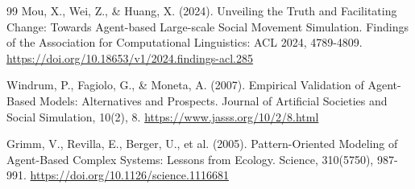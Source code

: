 \documentclass[11pt,a4paper]{article}
\begin{document}
\begin{thebibliography}{99}
Mou, X., Wei, Z., \& Huang, X. (2024). Unveiling the Truth and Facilitating Change: Towards Agent-based Large-scale Social Movement Simulation. Findings of the Association for Computational Linguistics: ACL 2024, 4789-4809. \url{https://doi.org/10.18653/v1/2024.findings-acl.285}

Windrum, P., Fagiolo, G., \& Moneta, A. (2007). Empirical Validation of Agent-Based Models: Alternatives and Prospects. Journal of Artificial Societies and Social Simulation, 10(2), 8. \url{https://www.jasss.org/10/2/8.html}

Grimm, V., Revilla, E., Berger, U., et al. (2005). Pattern-Oriented Modeling of Agent-Based Complex Systems: Lessons from Ecology. Science, 310(5750), 987-991. \url{https://doi.org/10.1126/science.1116681}

\end{thebibliography}
\end{document}
